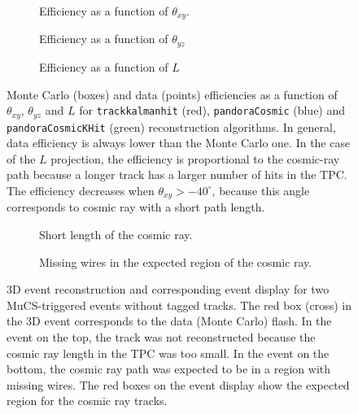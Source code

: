 \documentclass[a4paper]{scrartcl}
\begin{document}
\begin{figure}[htbp]
  \begin{center}
    \begin{subfigure}{0.55\textwidth}
      \caption{Efficiency as a function of $\theta_{xy}$.} \label{fig:xy}
    \end{subfigure}\begin{subfigure}{0.55\textwidth}
    \caption{Efficiency as a function of $\theta_{yz}$}\label{fig:yz}
  \end{subfigure}
  \begin{subfigure}{0.55\textwidth}
    \caption{Efficiency as a function of $L$}\label{fig:l}
  \end{subfigure}
  \caption{Monte Carlo (boxes) and data (points) efficiencies  as a function of $\theta_{xy}$, $\theta_{yz}$ and $L$ for \texttt{track\-kal\-man\-hit} (red), \texttt{pan\-do\-ra\-Co\-smic} (blue) and \texttt{pan\-do\-ra\-Co\-smicKHit} (green) reconstruction algorithms. In general, data efficiency is always lower than the Monte Carlo one. In the case of the $L$ projection, the efficiency is proportional to the cosmic-ray path because a longer track has a larger number of hits in the TPC. The efficiency decreases when  $\theta_{xy}> -40^{\circ}$, because this angle corresponds to cosmic ray with a short path length.} \label{fig:eff}
\end{center}
\end{figure}

\begin{figure}[htbp]
  \begin{subfigure}{1\textwidth}
    \begin{center}

    \end{center}
    \caption{Short length of the cosmic ray.}\label{fig:short}
    \vspace{1em}
  \end{subfigure}
  \begin{subfigure}{1\textwidth}
    \begin{center}
      \caption{Missing wires in the expected region of the cosmic ray.}\label{fig:wire}
    \end{center}
  \end{subfigure}
  \caption{3D event reconstruction and corresponding event display for two MuCS-triggered events without tagged tracks. The red box (cross) in the 3D event corresponds to the data (Monte Carlo) flash. In the event on the top, the track was not reconstructed because the cosmic ray length in the TPC was too small. In the event on the bottom, the cosmic ray path was expected to be in a region with missing wires. The red boxes on the event display show the expected region for the cosmic ray tracks.} \label{fig:ineff}
\end{figure}
\clearpage{}
\end{document}
